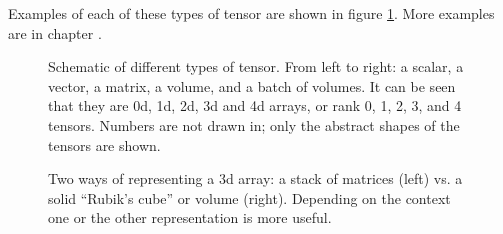 Examples of each of these types of tensor are shown in figure \ref{tensorTypes}. More examples are in chapter .

\begin{figure}[h]
\centering
{}
\caption[Soraya Boza.]{Schematic of different types of tensor. From left to right: a scalar, a vector, a matrix, a volume, and a batch of volumes. It can be seen that they are 0d, 1d, 2d, 3d and 4d arrays, or rank 0, 1, 2, 3, and 4 tensors. Numbers are not drawn in; only the abstract shapes of the tensors are shown.}
\label{tensorTypes}
\end{figure}

\begin{figure}[h]
\centering
{}
\caption[Soraya Boza.]{Two ways of representing a 3d array: a stack of matrices (left) vs. a solid ``Rubik's cube''  or volume (right). Depending on the context one or the other representation is more useful.}
\label{tensorVisualStyles}
\end{figure}

